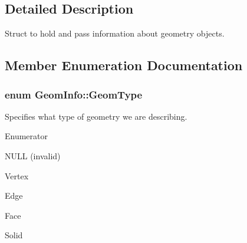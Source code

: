 \subsection{Detailed Description}
Struct to hold and pass information about geometry objects. 

\subsection{Member Enumeration Documentation}
\hypertarget{struct_geom_info_a5599514c547c57d65f341d62b65caad0}{
\subsubsection[{Geom\-Type}]{\setlength{\rightskip}{0pt plus 5cm}enum {\bf Geom\-Info\-::\-Geom\-Type}}}\label{struct_geom_info_a5599514c547c57d65f341d62b65caad0}


Specifies what type of geometry we are describing. 

\begin{Desc}
\item[Enumerator]\par
\begin{description}
\item[{\em 
\hypertarget{struct_geom_info_a5599514c547c57d65f341d62b65caad0ac4a683020056249df8d5ec2c435ed23e}{Null}\label{struct_geom_info_a5599514c547c57d65f341d62b65caad0ac4a683020056249df8d5ec2c435ed23e}
}]N\-U\-L\-L (invalid) \item[{\em 
\hypertarget{struct_geom_info_a5599514c547c57d65f341d62b65caad0a8b3ba3bda90e2e26cfd607d3bf2f10d7}{Vertex}\label{struct_geom_info_a5599514c547c57d65f341d62b65caad0a8b3ba3bda90e2e26cfd607d3bf2f10d7}
}]Vertex \item[{\em 
\hypertarget{struct_geom_info_a5599514c547c57d65f341d62b65caad0af10d43145fadd1fe008918de2d5eea55}{Edge}\label{struct_geom_info_a5599514c547c57d65f341d62b65caad0af10d43145fadd1fe008918de2d5eea55}
}]Edge \item[{\em 
\hypertarget{struct_geom_info_a5599514c547c57d65f341d62b65caad0ade4416774f0a723c80be9ce4f02b7b60}{Face}\label{struct_geom_info_a5599514c547c57d65f341d62b65caad0ade4416774f0a723c80be9ce4f02b7b60}
}]Face \item[{\em 
\hypertarget{struct_geom_info_a5599514c547c57d65f341d62b65caad0abf8e24db95b4ab93e5a4fb3a93919435}{Solid}\label{struct_geom_info_a5599514c547c57d65f341d62b65caad0abf8e24db95b4ab93e5a4fb3a93919435}
}]Solid \end{description}
\end{Desc}



